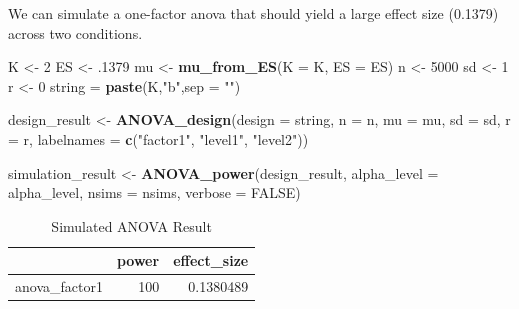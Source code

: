 \documentclass[]{book}
\newenvironment{Shaded}{\begin{snugshade}}{\end{snugshade}}
\newcommand{\DataTypeTok}[1]{\textcolor[rgb]{0.13,0.29,0.53}{#1}}
\newcommand{\DecValTok}[1]{\textcolor[rgb]{0.00,0.00,0.81}{#1}}
\newcommand{\FloatTok}[1]{\textcolor[rgb]{0.00,0.00,0.81}{#1}}
\newcommand{\KeywordTok}[1]{\textcolor[rgb]{0.13,0.29,0.53}{\textbf{#1}}}
\newcommand{\NormalTok}[1]{#1}
\newcommand{\OtherTok}[1]{\textcolor[rgb]{0.56,0.35,0.01}{#1}}
\newcommand{\StringTok}[1]{\textcolor[rgb]{0.31,0.60,0.02}{#1}}
\begin{document}
We can simulate a one-factor anova that should yield a large effect size (0.1379) across two conditions.

\begin{Shaded}
\begin{Highlighting}[]
\NormalTok{K <-}\StringTok{ }\DecValTok{2}
\NormalTok{ES <-}\StringTok{ }\FloatTok{.1379}
\NormalTok{mu <-}\StringTok{ }\KeywordTok{mu_from_ES}\NormalTok{(}\DataTypeTok{K =}\NormalTok{ K, }\DataTypeTok{ES =}\NormalTok{ ES)}
\NormalTok{n <-}\StringTok{ }\DecValTok{5000}
\NormalTok{sd <-}\StringTok{ }\DecValTok{1}
\NormalTok{r <-}\StringTok{ }\DecValTok{0}
\NormalTok{string =}\StringTok{ }\KeywordTok{paste}\NormalTok{(K,}\StringTok{"b"}\NormalTok{,}\DataTypeTok{sep =} \StringTok{""}\NormalTok{)}
\end{Highlighting}
\end{Shaded}

\begin{Shaded}
\begin{Highlighting}[]
\NormalTok{design_result <-}\StringTok{ }\KeywordTok{ANOVA_design}\NormalTok{(}\DataTypeTok{design =}\NormalTok{ string,}
                   \DataTypeTok{n =}\NormalTok{ n, }
                   \DataTypeTok{mu =}\NormalTok{ mu, }
                   \DataTypeTok{sd =}\NormalTok{ sd, }
                   \DataTypeTok{r =}\NormalTok{ r, }
                   \DataTypeTok{labelnames =} \KeywordTok{c}\NormalTok{(}\StringTok{"factor1"}\NormalTok{, }\StringTok{"level1"}\NormalTok{, }\StringTok{"level2"}\NormalTok{))}
\end{Highlighting}
\end{Shaded}

\begin{Shaded}
\begin{Highlighting}[]
\NormalTok{simulation_result <-}\StringTok{ }\KeywordTok{ANOVA_power}\NormalTok{(design_result, }
                                 \DataTypeTok{alpha_level =}\NormalTok{ alpha_level, }
                                 \DataTypeTok{nsims =}\NormalTok{ nsims,}
                                 \DataTypeTok{verbose =} \OtherTok{FALSE}\NormalTok{)}
\end{Highlighting}
\end{Shaded}

\begin{table}[!h]

\caption{\label{tab:unnamed-chunk-92}Simulated ANOVA Result}
\centering
\begin{tabular}{l|r|r}
\hline
  & power & effect\_size\\
\hline
anova\_factor1 & 100 & 0.1380489\\
\hline
\end{tabular}
\end{table}
\end{document}

